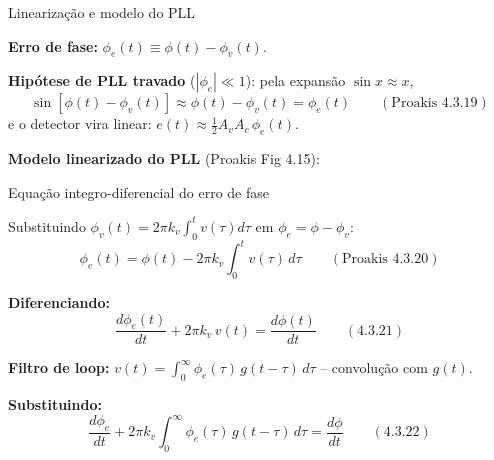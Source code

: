 \begin{frame}{Linearização e modelo do PLL}

\textbf{Erro de fase:} $\phi_e(t) \equiv \phi(t) - \phi_v(t)$.

\pause
\textbf{Hipótese de PLL travado} ($|\phi_e| \ll 1$): pela expansão $\sin x \approx x$,
\[
\sin[\phi(t) - \phi_v(t)] \approx \phi(t) - \phi_v(t) = \phi_e(t) \qquad (\text{Proakis 4.3.19})
\]
e o detector vira linear: $e(t) \approx \tfrac{1}{2}A_v A_c\,\phi_e(t)$.

\pause
\textbf{Modelo linearizado do PLL} (Proakis Fig 4.15):

\begin{center}
\end{center}

\end{frame}


\begin{frame}{Equação integro-diferencial do erro de fase}

Substituindo $\phi_v(t) = 2\pi k_v \!\int_0^t v(\tau)d\tau$ em $\phi_e = \phi - \phi_v$:
\[
\phi_e(t) = \phi(t) - 2\pi k_v \int_0^t v(\tau)\,d\tau \qquad (\text{Proakis 4.3.20})
\]

\pause
\textbf{Diferenciando:}
\[
\frac{d\phi_e(t)}{dt} + 2\pi k_v\,v(t) = \frac{d\phi(t)}{dt} \qquad (\text{4.3.21})
\]

\pause
\textbf{Filtro de loop:} $v(t) = \int_0^\infty \phi_e(\tau)\,g(t-\tau)\,d\tau$ -- convolução com $g(t)$.

\pause
\textbf{Substituindo:}
\[
\frac{d\phi_e}{dt} + 2\pi k_v\!\int_0^\infty\!\phi_e(\tau)\,g(t-\tau)\,d\tau = \frac{d\phi}{dt} \qquad (\text{4.3.22})
\]

\end{frame}

